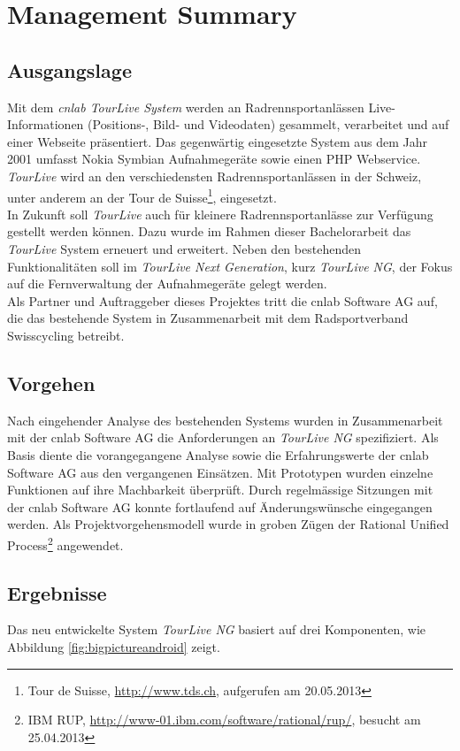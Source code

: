 \chapter*{Management Summary}
\section*{Ausgangslage}

Mit dem \textit{cnlab TourLive System} werden an Radrennsportanlässen Live- Informationen (Positions-, Bild- und Videodaten) gesammelt, verarbeitet und auf einer Webseite präsentiert. Das gegenwärtig eingesetzte System aus dem Jahr 2001  umfasst Nokia Symbian Aufnahmegeräte sowie einen PHP Webservice. \textit{TourLive} wird an den verschiedensten Radrennsportanlässen in der Schweiz, unter anderem an der Tour de Suisse\footnote{Tour de Suisse, \url{http://www.tds.ch}, aufgerufen am 20.05.2013}, eingesetzt. 
\\

In Zukunft soll \textit{TourLive} auch für kleinere Radrennsportanlässe zur Verfügung gestellt werden können. Dazu wurde im Rahmen dieser Bachelorarbeit das \textit{TourLive} System erneuert und erweitert. Neben den bestehenden Funktionalitäten soll im \textit{TourLive Next Generation}, kurz \textit{TourLive NG}, der Fokus auf die Fernverwaltung der Aufnahmegeräte gelegt werden. 
\\

Als Partner und Auftraggeber dieses Projektes tritt die cnlab Software AG auf, die das bestehende System in Zusammenarbeit mit dem Radsportverband Swisscycling betreibt.

\section*{Vorgehen}
Nach eingehender Analyse des bestehenden Systems wurden in Zusammenarbeit mit der cnlab Software AG die Anforderungen an \textit{TourLive NG} spezifiziert. Als Basis diente die vorangegangene Analyse sowie die  Erfahrungswerte der cnlab Software AG aus den vergangenen Einsätzen. Mit Prototypen wurden einzelne Funktionen auf ihre Machbarkeit überprüft. Durch regelmässige Sitzungen mit der cnlab Software AG konnte fortlaufend auf Änderungswünsche eingegangen werden. Als Projektvorgehensmodell wurde in groben Zügen der Rational Unified Process\footnote{IBM RUP, \url{http://www-01.ibm.com/software/rational/rup/}, besucht am 25.04.2013} angewendet.
\newpage 

\section*{Ergebnisse}
Das neu entwickelte System \textit{TourLive NG} basiert auf drei Komponenten, wie Abbildung \ref{fig:bigpictureandroid} zeigt.

